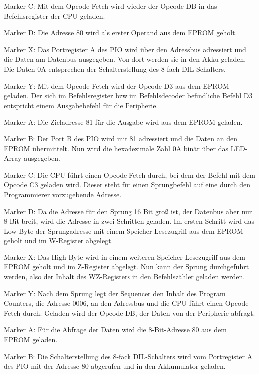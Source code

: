 Marker C: Mit dem Opcode Fetch wird wieder der Opcode DB in das Befehlsregister der CPU geladen.

Marker D: Die Adresse 80 wird als erster Operand aus dem EPROM geholt.

Marker X: Das Portregister A des PIO wird über den Adressbus adressiert und die Daten am Datenbus ausgegeben. Von dort werden sie in den Akku geladen. Die Daten 0A entsprechen der Schalterstellung des 8-fach DIL-Schalters.

Marker Y: Mit dem Opcode Fetch wird der Opcode D3 aus dem EPROM geladen. Der sich im Befehlsregister bzw im Befehlsdecoder befindliche Befehl D3 entspricht einem Ausgabebefehl für die Peripherie.

Marker A: Die Zieladresse 81 für die Ausgabe wird aus dem EPROM geladen.

Marker B: Der Port B des PIO wird mit 81 adressiert und die Daten an den EPROM übermittelt. Nun wird die hexadezimale Zahl 0A binär über das LED-Array ausgegeben.

Marker C: Die CPU führt einen Opcode Fetch durch, bei dem der Befehl mit dem Opcode C3 geladen wird. Dieser steht für einen Sprungbefehl auf eine durch den Programmierer vorzugebende Adresse.

Marker D: Da die Adresse für den Sprung 16 Bit groß ist, der Datenbus aber nur 8 Bit breit, wird die Adresse in zwei Schritten geladen. Im ersten Schritt wird das Low Byte der Sprungadresse mit einem Speicher-Lesezugriff aus dem EPROM geholt und im W-Register abgelegt.

Marker X: Das High Byte wird in einem weiteren Speicher-Lesezugriff aus dem EPROM geholt und im Z-Register abgelegt. Nun kann der Sprung durchgeführt werden, also der Inhalt des WZ-Registers in den Befehlszähler geladen werden.

Marker Y: Nach dem Sprung legt der Sequencer den Inhalt des Program Counters, die Adresse 0006, an den Adressbus und die CPU führt einen Opcode Fetch durch. Geladen wird der Opcode DB, der Daten von der Peripherie abfragt.

Marker A: Für die Abfrage der Daten wird die 8-Bit-Adresse 80 aus dem EPROM geladen.

Marker B: Die Schalterstellung des 8-fach DIL-Schalters wird vom Portregister A des PIO mit der Adresse 80 abgerufen und in den Akkumulator geladen.

